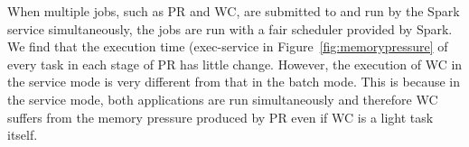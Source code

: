 
When multiple jobs, such as PR and WC, are submitted to and run by the Spark 
service simultaneously, the jobs are run with a fair scheduler provided by Spark. 
We find that the execution time 
(exec-service in Figure~\ref{fig:memorypressure} of every task in each stage of PR has little change.
However, the execution of WC in the service mode is very different from that in the batch mode. This is because in the service mode, both applications are run simultaneously and therefore WC suffers from the memory pressure produced by PR even if WC is a
light task itself. 


